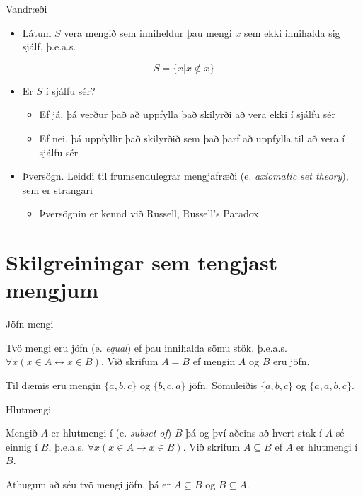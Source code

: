 \documentclass{beamer}
\begin{document}
\begin{frame}{Vandræði}
\begin{itemize}
 \item Látum $S$ vera mengið sem inniheldur þau mengi $x$ sem ekki innihalda sig sjálf, þ.e.a.s.
\end{itemize}
\[
 S = \{x | x \notin x\}
\]
\begin{itemize}
 \item Er $S$ í sjálfu sér? \pause
 \begin{itemize}
  \item Ef já, þá verður það að uppfylla það skilyrði að vera ekki í sjálfu sér \pause
  \item Ef nei, þá uppfyllir það skilyrðið sem það þarf að uppfylla til að vera í sjálfu sér \pause
 \end{itemize}
 \item Þversögn. Leiddi til frumsendulegrar mengjafræði (e. \emph{axiomatic set theory}), sem er strangari
 \begin{itemize}
  \item Þversögnin er kennd við Russell, Russell's Paradox
 \end{itemize}

\end{itemize}
\end{frame}

\section{Skilgreiningar sem tengjast mengjum}

\begin{frame}{Jöfn mengi}
\begin{tcolorbox}[title=Jöfn mengi]
Tvö mengi eru jöfn (e. \emph{equal}) ef þau innihalda sömu stök, þ.e.a.s. $\forall x (x \in A \leftrightarrow x \in B ) $. Við skrifum $A = B$ ef mengin $A$ og $B$ eru jöfn.
\end{tcolorbox}
Til dæmis eru mengin $\{a, b, c\}$ og $\{b, c, a\}$ jöfn. Sömuleiðis $\{a, b, c\}$ og $\{a, a, b, c\}$.
\end{frame}

\begin{frame}{Hlutmengi}
\begin{tcolorbox}[title=Hlutmengi]
Mengið $A$ er hlutmengi í (e. \emph{subset of}) $B$ þá og því aðeins að hvert stak í $A$ sé einnig í $B$, þ.e.a.s. $\forall x (x \in A \to x \in B)$. Við skrifum $A \subseteq B$ ef $A$ er hlutmengi í $B$.
\end{tcolorbox}

Athugum að séu tvö mengi jöfn, þá er $A \subseteq B$ og $B \subseteq A$.
\end{frame}
\end{document}

